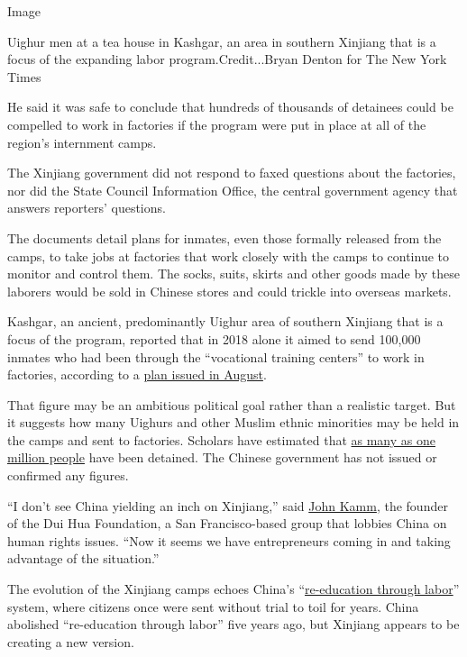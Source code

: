 Image

Uighur men at a tea house in Kashgar, an area in southern Xinjiang that
is a focus of the expanding labor program.Credit...Bryan Denton for The
New York Times

He said it was safe to conclude that hundreds of thousands of detainees
could be compelled to work in factories if the program were put in place
at all of the region's internment camps.

The Xinjiang government did not respond to faxed questions about the
factories, nor did the State Council Information Office, the central
government agency that answers reporters' questions.

The documents detail plans for inmates, even those formally released
from the camps, to take jobs at factories that work closely with the
camps to continue to monitor and control them. The socks, suits, skirts
and other goods made by these laborers would be sold in Chinese stores
and could trickle into overseas markets.

Kashgar, an ancient, predominantly Uighur area of southern Xinjiang that
is a focus of the program, reported that in 2018 alone it aimed to send
100,000 inmates who had been through the ``vocational training centers''
to work in factories, according to a
\href{http://kashi.gov.cn/Government/PublicInfoShow.aspx?ID=2963}{plan
issued in August}.

That figure may be an ambitious political goal rather than a realistic
target. But it suggests how many Uighurs and other Muslim ethnic
minorities may be held in the camps and sent to factories. Scholars have
estimated that
\href{https://jamestown.org/program/evidence-for-chinas-political-re-education-campaign-in-xinjiang/}{as
many as one million people} have been detained. The Chinese government
has not issued or confirmed any figures.

``I don't see China yielding an inch on Xinjiang,'' said
\href{https://duihua.org/who-we-are/\#0}{John Kamm}, the founder of the
Dui Hua Foundation, a San Francisco-based group that lobbies China on
human rights issues. ``Now it seems we have entrepreneurs coming in and
taking advantage of the situation.''

The evolution of the Xinjiang camps echoes China's
``\href{https://www.nytimes3xbfgragh.onion/1981/01/03/world/hundreds-of-thousands-toil-in-chinese-labor-camps.html}{re-education
through labor}'' system, where citizens once were sent without trial to
toil for years. China abolished ``re-education through labor'' five
years ago, but Xinjiang appears to be creating a new version.

